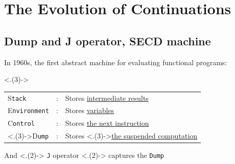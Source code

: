 \section{The Evolution of Continuations}
\TableOfContents{}

\subsection{Dump and J operator, SECD machine}
\begin{frame}[fragile]
	\frametitlesubs

	In 1960s, the first abstract machine for evaluating \textcolor{subhighlight}{functional} programs\cite{landin1964mechanical}:

	\only<.(3)->\small
	\vspace{-.4\zh}
	\begin{table}[h!]
		\begin{tabular}{lcl}

			{\boldslant S}\texttt{tack}                   & : & Stores \underline{intermediate results}                                                \\
			{\boldslant E}\texttt{nvironment}             & : & Stores \underline{variables}                                                           \\
			{\boldslant C}\texttt{ontrol}                 & : & Stores \underline{the next instruction}                                                \\

			\only<.(3)->\large {\boldslant D}\texttt{ump} & : & Stores {\only<.(3)->{\large\bf\color{highlight}}\underline{the suspended computation}} \\
		\end{tabular}
	\end{table}

	\pause
	\vspace{-.4\zh}
	\hspace{1.7\zw}
	And
	\only<.(2)->\large
	\verb|J| operator
		{\only<.(2)->{\bf\color{highlight}}
			captures the \verb|Dump|}\cite{landin1965generalization}

	\pause
	\vspace{-1.4\zh}
	\begin{figure}[h!]
	\end{figure}
\end{frame}


